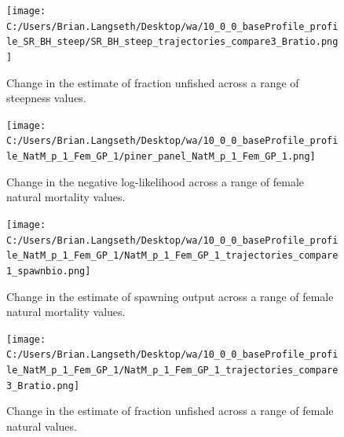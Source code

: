 \documentclass[11pt,
  english,
  a4paper,
]{article}
\begin{document}
\begin{figure}
\centering
\texttt{[image: C:/Users/Brian.Langseth/Desktop/wa/10\_0\_0\_baseProfile\_profile\_SR\_BH\_steep/SR\_BH\_steep\_trajectories\_compare3\_Bratio.png]}
\caption{Change in the estimate of fraction unfished across a range of steepness values.\label{fig:h-depl}}
\end{figure}

\tagmcend\tagstructend


\begin{figure}
\centering
\texttt{[image: C:/Users/Brian.Langseth/Desktop/wa/10\_0\_0\_baseProfile\_profile\_NatM\_p\_1\_Fem\_GP\_1/piner\_panel\_NatM\_p\_1\_Fem\_GP\_1.png]}
\caption{Change in the negative log-likelihood across a range of female natural mortality values.\label{fig:m-profile}}
\end{figure}

\tagmcend\tagstructend


\begin{figure}
\centering
\texttt{[image: C:/Users/Brian.Langseth/Desktop/wa/10\_0\_0\_baseProfile\_profile\_NatM\_p\_1\_Fem\_GP\_1/NatM\_p\_1\_Fem\_GP\_1\_trajectories\_compare1\_spawnbio.png]}
\caption{Change in the estimate of spawning output across a range of female natural mortality values.\label{fig:m-ssb}}
\end{figure}

\tagmcend\tagstructend


\begin{figure}
\centering
\texttt{[image: C:/Users/Brian.Langseth/Desktop/wa/10\_0\_0\_baseProfile\_profile\_NatM\_p\_1\_Fem\_GP\_1/NatM\_p\_1\_Fem\_GP\_1\_trajectories\_compare3\_Bratio.png]}
\caption{Change in the estimate of fraction unfished across a range of female natural values.\label{fig:m-depl}}
\end{figure}

\tagmcend\tagstructend

\end{document}
